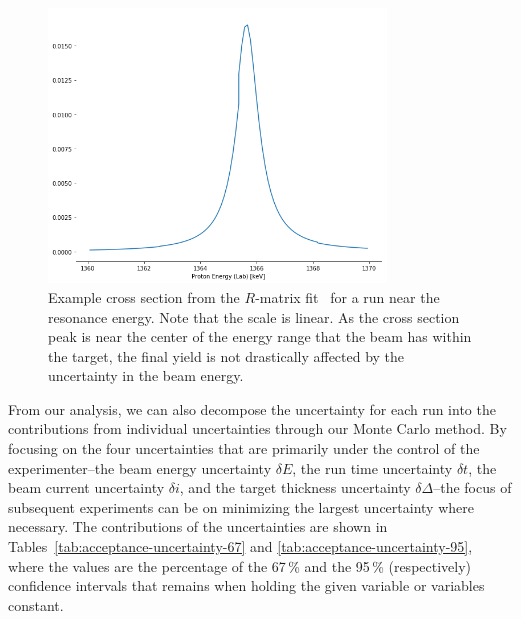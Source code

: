 \begin{figure}[h]
    \begin{center}
        \centerline{
            \includegraphics[width=0.8\textwidth]{figures/xs_example.png}}
        \caption[Example cross section]{Example cross section from the
            $R$-matrix fit~\cite{deBoer2017} for a run near the resonance
            energy. Note that the scale is linear. As the cross section
            peak is near the center of the energy range that the beam
            has within the target, the final yield is not drastically
            affected by the uncertainty in the beam energy.}
        \label{fig:example-cross-section}
    \end{center}
\end{figure}

From our analysis, we can also decompose the uncertainty for each run
into the contributions from individual uncertainties through our Monte
Carlo method. By focusing on the four uncertainties that are primarily
under the control of the experimenter\---{}the beam energy uncertainty
$\delta E$, the run time uncertainty $\delta t$, the beam current
uncertainty $\delta i$, and the target thickness uncertainty
$\delta\Delta$\---{}the focus of subsequent experiments can be on
minimizing the largest uncertainty where necessary. The contributions of
the uncertainties are shown in
Tables~\ref{tab:acceptance-uncertainty-67} and
\ref{tab:acceptance-uncertainty-95}, where the values are the percentage
of the 67\,\% and the 95\,\% (respectively) confidence intervals that
remains when holding the given variable or variables constant.

